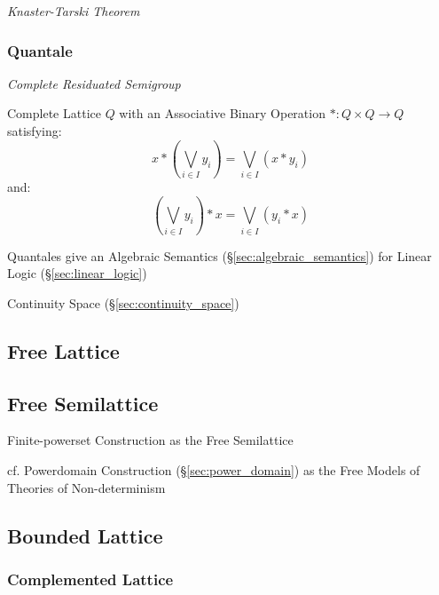 \emph{Knaster-Tarski Theorem}



\subsubsection{Quantale}\label{sec:quantale}

\emph{Complete Residuated Semigroup}

Complete Lattice $Q$ with an Associative Binary Operation $* : Q
\times Q \rightarrow Q$ satisfying:
\[
  x*(\bigvee_{i \in I} y_i) = \bigvee_{i \in I}(x * y_i)
\]
and:
\[
  (\bigvee_{i \in I} y_i)*x = \bigvee_{i \in I}(y_i * x)
\]

Quantales give an Algebraic Semantics
(\S\ref{sec:algebraic_semantics}) for Linear Logic
(\S\ref{sec:linear_logic})

Continuity Space (\S\ref{sec:continuity_space})



\subsection{Free Lattice}\label{sec:free_lattice}

\subsection{Free Semilattice}\label{sec:free_semilattice}

Finite-powerset Construction as the Free Semilattice %

cf. Powerdomain Construction (\S\ref{sec:power_domain}) as the Free
Models of Theories of Non-determinism



\subsection{Bounded Lattice}\label{sec:bounded_lattice}

\subsubsection{Complemented Lattice}\label{sec:complemented_lattice}

